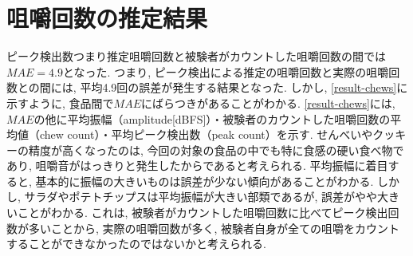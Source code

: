 \section{咀嚼回数の推定結果}

ピーク検出数つまり推定咀嚼回数と被験者がカウントした咀嚼回数の間では$MAE = 4.9$となった. つまり, ピーク検出による推定の咀嚼回数と実際の咀嚼回数との間には, 平均4.9回の誤差が発生する結果となった. しかし, \tablename\ref{result-chews}に示すように, 食品間で$MAE$にばらつきがあることがわかる. \tablename\ref{result-chews}には, $MAE$の他に平均振幅（amplitude[dBFS]）・被験者のカウントした咀嚼回数の平均値（chew count）・平均ピーク検出数（peak count）を示す. せんべいやクッキーの精度が高くなったのは, 今回の対象の食品の中でも特に食感の硬い食べ物であり, 咀嚼音がはっきりと発生したからであると考えられる. 平均振幅に着目すると, 基本的に振幅の大きいものは誤差が少ない傾向があることがわかる. しかし, サラダやポテトチップスは平均振幅が大きい部類であるが, 誤差がやや大きいことがわかる. これは, 被験者がカウントした咀嚼回数に比べてピーク検出回数が多いことから, 実際の咀嚼回数が多く, 被験者自身が全ての咀嚼をカウントすることができなかったのではないかと考えられる.
